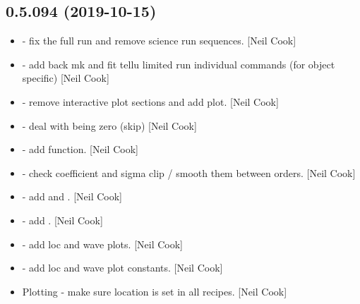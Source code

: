 \documentclass[a4paper,10pt,english]{report}
\begin{document}
\subsection{0.5.094 (2019-10-15)}
\label{\detokenize{misc/changelog:id49}}\begin{itemize}
\item {} 
 - fix the full run and
remove science run sequences. {[}Neil Cook{]}

\item {} 
 - add back mk and fit
tellu limited run individual commands (for object specific) {[}Neil
Cook{]}

\item {} 
 - remove interactive plot sections and add
 plot. {[}Neil Cook{]}

\item {} 
 - deal with  being zero (skip) {[}Neil
Cook{]}

\item {} 
 - add  function. {[}Neil Cook{]}

\item {} 
 - check coefficient and sigma clip /
smooth them between orders. {[}Neil Cook{]}

\item {} 
 - add  and
. {[}Neil Cook{]}

\item {} 
 - add . {[}Neil Cook{]}

\item {} 
 - add loc and wave
plots. {[}Neil Cook{]}

\item {} 
 - add loc and wave plot
constants. {[}Neil Cook{]}

\item {} 
Plotting - make sure location is set in all recipes. {[}Neil Cook{]}

\end{itemize}
\end{document}

